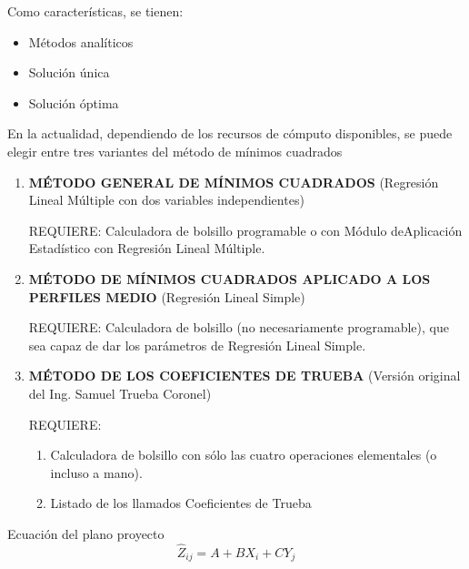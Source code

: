 \Schema{-1.4ex}{15ex}
{} { \Schema{-1ex}{9ex}
	{}
	{ 
		{}
		\medskip
		{} 
  {}
		\medskip
  {}
		\medskip
  {}
		\medskip
	  {}
}
	\Schema{0ex}{2ex}
	{}
	{
	}
	\Schema{0ex}{2ex}
	{}
	{
	}
}
Como características, se tienen:
\begin{itemize}
  \item Métodos analíticos
  \item Solución única
  \item Solución óptima
\end{itemize}
En la actualidad, dependiendo de los recursos de cómputo disponibles, se puede elegir entre tres variantes del método de mínimos cuadrados 
\begin{enumerate}
  \item \textbf{MÉTODO GENERAL DE MÍNIMOS CUADRADOS} (Regresión Lineal Múltiple con dos variables independientes)
  
  REQUIERE: Calculadora de bolsillo programable o con Módulo deAplicación Estadístico con Regresión Lineal Múltiple.
  \item \textbf{MÉTODO DE MÍNIMOS CUADRADOS APLICADO A LOS PERFILES MEDIO} (Regresión Lineal Simple)

  REQUIERE: Calculadora de bolsillo (no necesariamente programable), que sea capaz de dar los parámetros de Regresión Lineal Simple.

  \item \textbf{MÉTODO DE LOS COEFICIENTES DE TRUEBA} (Versión original del Ing. Samuel Trueba Coronel)
  
  REQUIERE:
  \begin{enumerate}
    \item Calculadora de bolsillo con sólo las cuatro operaciones elementales (o incluso a mano).
    \item Listado de los llamados Coeficientes de Trueba
  \end{enumerate}
\end{enumerate}
Ecuación del plano proyecto
\begin{equation}
  \hat{Z}_{ij} = A + BX_i + CY_j
\end{equation}
